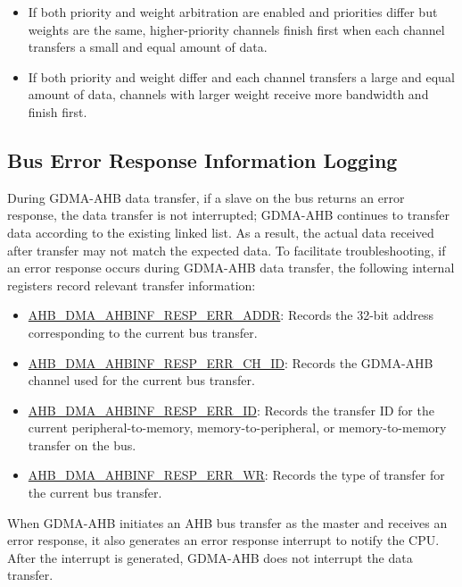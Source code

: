 \documentclass[main\_\_EN.tex]{subfiles}
\begin{document}
\begin{tiplisting}
\vspace{-2em}
\begin{itemize}
    \item If both priority and weight arbitration are enabled and priorities differ but weights are the same, higher-priority channels finish first when each channel transfers a small and equal amount of data.
    \item If both priority and weight differ and each channel transfers a large and equal amount of data, channels with larger weight receive more bandwidth and finish first.
\end{itemize}
\end{tiplisting}


\subsection{Bus Error Response Information Logging}\label{sec:dma-bus-error-resp}

During GDMA-AHB data transfer, if a slave on the bus returns an error response, the data transfer is not interrupted; GDMA-AHB continues to transfer data according to the existing linked list. As a result, the actual data received after transfer may not match the expected data. To facilitate troubleshooting, if an error response occurs during GDMA-AHB data transfer, the following internal registers record relevant transfer information:

\begin{itemize}
    \item \hyperref[fielddesc:AHBDMAAHBINFRESPERRADDR]{AHB\_DMA\_AHBINF\_RESP\_ERR\_ADDR}: Records the 32-bit address corresponding to the current bus transfer.
    \item \hyperref[fielddesc:AHBDMAAHBINFRESPERRCHID]{AHB\_DMA\_AHBINF\_RESP\_ERR\_CH\_ID}: Records the GDMA-AHB channel used for the current bus transfer.
    \item \hyperref[fielddesc:AHBDMAAHBINFRESPERRID]{AHB\_DMA\_AHBINF\_RESP\_ERR\_ID}: Records the transfer ID for the current peripheral-to-memory, memory-to-peripheral, or memory-to-memory transfer on the bus.
    \item \hyperref[fielddesc:AHBDMAAHBINFRESPERRWR]{AHB\_DMA\_AHBINF\_RESP\_ERR\_WR}: Records the type of transfer for the current bus transfer.
\end{itemize}

When GDMA-AHB initiates an AHB bus transfer as the master and receives an error response, it also generates an error response interrupt to notify the CPU. After the interrupt is generated, GDMA-AHB does not interrupt the data transfer.
\end{document}
